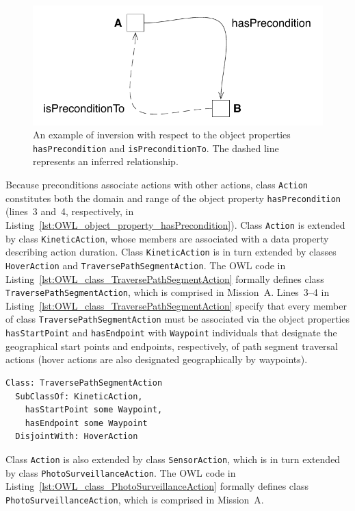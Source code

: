\begin{figure}[ht]
\centering
\includegraphics[scale=0.58]{img/inverse-properties.pdf}
\caption[Inverse properties]{An example of inversion with respect to the object properties \texttt{hasPrecondition} and \texttt{isPreconditionTo}. The dashed line represents an inferred relationship.}
\label{fig:inverse_properties}
\end{figure}

Because preconditions associate actions with other actions, class \texttt{Action} constitutes both the domain and range of the object property \texttt{hasPrecondition} (lines~3 and~4, respectively, in Listing~\ref{lst:OWL_object_property_hasPrecondition}). Class \texttt{Action} is extended by class \texttt{KineticAction}, whose members are associated with a data property describing action duration. Class \texttt{KineticAction} is in turn extended by classes \texttt{HoverAction} and \texttt{TraversePathSegment\-Action}. The OWL code in Listing~\ref{lst:OWL_class_TraversePathSegmentAction} formally defines class \texttt{TraversePathSegment\-Action}, which is comprised in Mission~A\@. Lines~3--4 in Listing~\ref{lst:OWL_class_TraversePathSegmentAction} specify that every member of class \texttt{TraversePathSegmentAction} must be associated via the object properties \texttt{hasStartPoint} and \texttt{hasEndpoint} with \texttt{Waypoint} individuals that designate the geographical start points and endpoints, respectively, of path segment traversal actions (hover actions are also designated geographically by waypoints).

\begin{lstlisting}[caption={OWL code for class \texttt{TraversePathSegmentAction}},label=lst:OWL_class_TraversePathSegmentAction]
Class: TraversePathSegmentAction
  SubClassOf: KineticAction,
    hasStartPoint some Waypoint,
    hasEndpoint some Waypoint
  DisjointWith: HoverAction
\end{lstlisting}

Class \texttt{Action} is also extended by class \texttt{SensorAction}, which is in turn extended by class \texttt{PhotoSurveillanceAction}. The OWL code in Listing~\ref{lst:OWL_class_PhotoSurveillanceAction} formally defines class \texttt{PhotoSurveillanceAction}, which is comprised in Mission~A\@.

